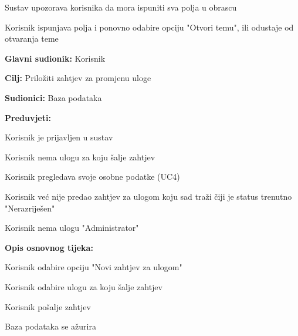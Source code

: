 \begin{packed_item}
\begin{packed_item}
\begin{packed_enum}
								\item Sustav upozorava korisnika da mora ispuniti sva polja u obrascu
								\item Korisnik ispunjava polja i ponovno odabire opciju "Otvori temu", ili odustaje od otvaranja teme
								
							\end{packed_enum}
                    		\end{packed_item}				
						
					\end{packed_item}
					
					\noindent {}
					\begin{packed_item}
	
						\item \textbf{Glavni sudionik: }Korisnik
						\item  \textbf{Cilj:} Priložiti zahtjev za promjenu uloge
						\item  \textbf{Sudionici:} Baza podataka
						\item  \textbf{Preduvjeti:}
						\item[] \begin{packed_enum}
							\item Korisnik je prijavljen u sustav
							\item Korisnik nema ulogu za koju šalje zahtjev
							\item Korisnik pregledava svoje osobne podatke (UC4)
							\item Korisnik već nije predao zahtjev za ulogom koju sad traži čiji je status trenutno "Nerazriješen"
							\item Korisnik nema ulogu "Administrator"
							\end{packed_enum}
						\item  \textbf{Opis osnovnog tijeka:}
						
						\item[] \begin{packed_enum}
	
							\item Korisnik odabire opciju "Novi zahtjev za ulogom"
							\item Korisnik odabire ulogu za koju šalje zahtjev
							\item Korisnik pošalje zahtjev
							\item Baza podataka se ažurira
						\end{packed_enum}
						

\end{packed_item}
